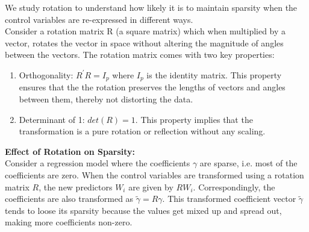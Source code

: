 We study rotation to understand how likely it is to maintain sparsity when the control variables are re-expressed in different ways. \\

Consider a rotation matrix R (a square matrix) which when multiplied by a vector, rotates the vector in space without altering the magnitude of angles between the vectors. The rotation matrix comes with two key properties:
\begin{enumerate}
    \item Orthogonality: $R^{\prime} R=I_p$ where $I_p$ is the identity matrix. This property ensures that the the rotation preserves the lengths of vectors and angles between them, thereby not distorting the data. 
    \item Determinant of 1: $det(R) = 1$. This property implies that the transformation is a pure rotation or reflection without any scaling.
\end{enumerate}


\textbf{Effect of Rotation on Sparsity:}\\
Consider a regression model where the coefficients $\gamma$ are sparse, i.e. most of the coefficients are zero. When the control variables are transformed using a rotation matrix $R$, the new predictors $W_i$ are given by $RW_i$. Correspondingly, the coefficients are also transformed as $\tilde{\gamma}=R \gamma$. This transformed coefficient vector $\tilde{\gamma}$ tends to loose its sparsity because the values get mixed up and spread out, making more coefficients non-zero. 


